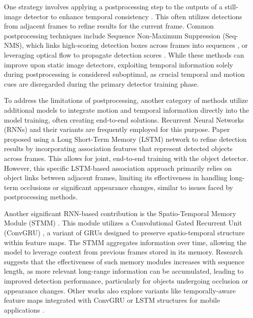 One strategy involves applying a postprocessing step to the outputs of a still-image detector to enhance temporal consistency \cite{hanSeqNMSVideoObject2016, kangTCNNTubeletsConvolutional2018, kangObjectDetectionVideo2016}. This often utilizes detections from adjacent frames to refine results for the current frame. Common postprocessing techniques include Sequence Non-Maximum Suppression (Seq-NMS), which links high-scoring detection boxes across frames into sequences \cite{hanSeqNMSVideoObject2016}, or leveraging optical flow to propagate detection scores \cite{kangTCNNTubeletsConvolutional2018, kangObjectDetectionVideo2016, zhuFlowGuidedFeature2017}. While these methods can improve upon static image detectors, exploiting temporal information solely during postprocessing is considered suboptimal, as crucial temporal and motion cues are disregarded during the primary detector training phase.

To address the limitations of postprocessing, another category of methods utilize additional models to integrate motion and temporal information directly into the model training, often creating end-to-end solutions. Recurrent Neural Networks (RNNs) and their variants are frequently employed for this purpose. Paper \cite{Lu_2017_ICCV} proposed using a Long Short-Term Memory (LSTM) network \cite{6795963} to refine detection results by incorporating association features that represent detected objects across frames. This allows for joint, end-to-end training with the object detector. However, this specific LSTM-based association approach primarily relies on object links between adjacent frames, limiting its effectiveness in handling long-term occlusions or significant appearance changes, similar to issues faced by postprocessing methods.

Another significant RNN-based contribution is the Spatio-Temporal Memory Module (STMM) \cite{xiaoVideoObjectDetection2018}. This module utilizes a Convolutional Gated Recurrent Unit (ConvGRU) \cite{ballasDelvingDeeperConvolutional2016}, a variant of GRUs designed to preserve spatio-temporal structure within feature maps. The STMM aggregates information over time, allowing the model to leverage context from previous frames stored in its memory. Research suggests that the effectiveness of such memory modules increases with sequence length, as more relevant long-range information can be accumulated, leading to improved detection performance, particularly for objects undergoing occlusion or appearance changes. Other works also explore variants like temporally-aware feature maps integrated with ConvGRU or LSTM structures for mobile applications \cite{}.

